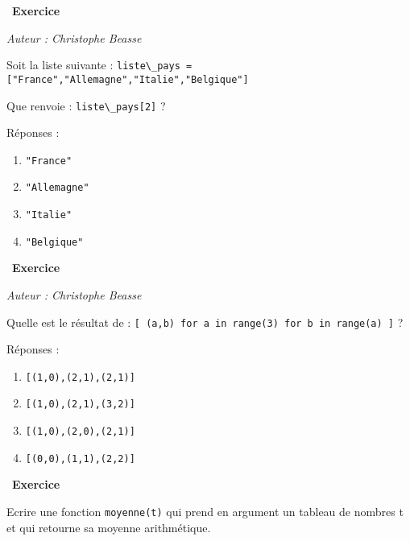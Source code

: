 \documentclass[
  11pt,
]{article}
\newcommand{\passthrough}[1]{#1}
\providecommand{\tightlist}{%
  \setlength{\itemsep}{0pt}\setlength{\parskip}{0pt}}
\newcounter{exo}
\newenvironment{exercice}[1]
{\par \medskip   \addtocounter{exo}{1} \noindent  
\begin{bclogo}[arrondi =0.1,   noborder = true, logo=\bccrayon, marge=4]{~\textbf{Exercice} \textbf{\theexo} {\itshape #1} }  \par}
{
\end{bclogo}
 \par \bigskip }
\newcounter{def}
\begin{document}
\begin{exercice}{}

\emph{Auteur : Christophe Beasse}

Soit la liste suivante :
\passthrough{\lstinline!liste\_pays = ["France","Allemagne","Italie","Belgique"]!}

Que renvoie : \passthrough{\lstinline!liste\_pays[2]!} ?

Réponses :

\begin{enumerate}
\def\labelenumi{\Alph{enumi})}
\tightlist
\item
  \passthrough{\lstinline!"France"!}
\item
  \passthrough{\lstinline!"Allemagne"!}
\item
  \passthrough{\lstinline!"Italie"!}
\item
  \passthrough{\lstinline!"Belgique"!}
\end{enumerate}

\end{exercice}

\begin{exercice}{}

\emph{Auteur : Christophe Beasse}

Quelle est le résultat de :
\passthrough{\lstinline![ (a,b) for a in range(3) for b in range(a) ]!}
?

Réponses :

\begin{enumerate}
\def\labelenumi{\Alph{enumi})}
\tightlist
\item
  \passthrough{\lstinline![(1,0),(2,1),(2,1)]!}
\item
  \passthrough{\lstinline![(1,0),(2,1),(3,2)]!}
\item
  \passthrough{\lstinline![(1,0),(2,0),(2,1)]!}
\item
  \passthrough{\lstinline![(0,0),(1,1),(2,2)]!}
\end{enumerate}

\end{exercice}

\begin{exercice}{}

Ecrire une fonction \passthrough{\lstinline!moyenne(t)!} qui prend en
argument un tableau de nombres t et qui retourne sa moyenne
arithmétique.

\end{exercice}
\end{document}
